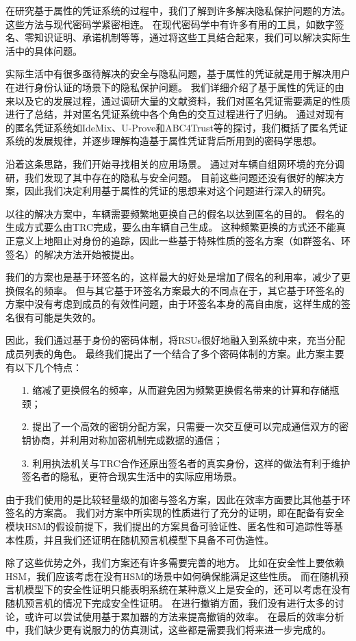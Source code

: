 
\begin{conclusions}

在研究基于属性的凭证系统的过程中，我们了解到许多解决隐私保护问题的方法。
这些方法与现代密码学紧密相连。
在现代密码学中有许多有用的工具，如数字签名、零知识证明、承诺机制等等，通过将这些工具结合起来，我们可以解决实际生活中的具体问题。

实际生活中有很多亟待解决的安全与隐私问题，基于属性的凭证就是用于解决用户在进行身份认证的场景下的隐私保护问题。
我们详细介绍了基于属性的凭证的由来以及它的发展过程，通过调研大量的文献资料，我们对匿名凭证需要满足的性质进行了总结，并对匿名凭证系统中各个角色的交互过程进行了归纳。
通过对现有的匿名凭证系统如IdeMix、U-Prove和ABC4Trust等的探讨，我们概括了匿名凭证系统的发展规律，并逐步理解构造基于属性凭证背后所用到的密码学思想。

沿着这条思路，我们开始寻找相关的应用场景。
通过对车辆自组网环境的充分调研，我们发现了其中存在的隐私与安全问题。
目前这些问题还没有很好的解决方案，因此我们决定利用基于属性的凭证的思想来对这个问题进行深入的研究。

以往的解决方案中，车辆需要频繁地更换自己的假名以达到匿名的目的。
假名的生成方式要么由TRC完成，要么由车辆自己生成。
这种频繁更换的方式还不能真正意义上地阻止对身份的追踪，因此一些基于特殊性质的签名方案（如群签名、环签名）的解决方法开始被提出。

我们的方案也是基于环签名的，这样最大的好处是增加了假名的利用率，减少了更换假名的频率。
但与其它基于环签名方案最大的不同点在于，其它基于环签名的方案中没有考虑到成员的有效性问题，由于环签名本身的高自由度，这样生成的签名很有可能是失效的。

因此，我们通过基于身份的密码体制，将RSUs很好地融入到系统中来，充当分配成员列表的角色。
最终我们提出了一个结合了多个密码体制的方案。此方案主要有以下几个特点：
\begin{itemize}
  \item[1.] 缩减了更换假名的频率，从而避免因为频繁更换假名带来的计算和存储瓶颈；
  \item[2.] 提出了一个高效的密钥分配方案，只需要一次交互便可以完成通信双方的密钥协商，并利用对称加密机制完成数据的通信；
  \item[3.] 利用执法机关与TRC合作还原出签名者的真实身份，这样的做法有利于维护签名者的隐私，更符合现实生活中的实际应用场景。
\end{itemize}

由于我们使用的是比较轻量级的加密与签名方案，因此在效率方面要比其他基于环签名的方案高。
我们对方案中所实现的性质进行了充分的证明，即在配备有安全模块HSM的假设前提下，我们提出的方案具备可验证性、匿名性和可追踪性等基本性质，并且我们还证明在随机预言机模型下具备不可伪造性。

除了这些优势之外，我们方案还有许多需要完善的地方。
比如在安全性上要依赖HSM，我们应该考虑在没有HSM的场景中如何确保能满足这些性质。
而在随机预言机模型下的安全性证明只能表明系统在某种意义上是安全的，还可以考虑在没有随机预言机的情况下完成安全性证明。
在进行撤销方面，我们没有进行太多的讨论，或许可以尝试使用基于累加器的方法来提高撤销的效率。
在最后的效率分析中，我们缺少更有说服力的仿真测试，这些都是需要我们将来进一步完成的。
\end{conclusions}
